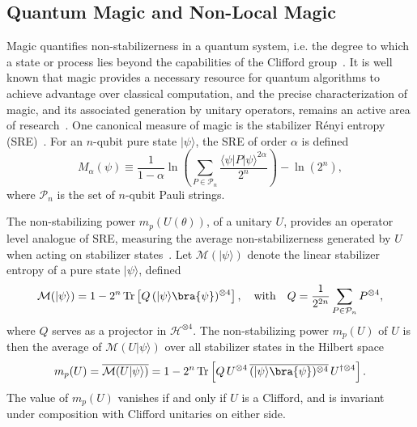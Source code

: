 \documentclass[12pt,a4paper]{article}
\def\ket#1{{|{#1}\rangle}}
\begin{document}
\subsection{Quantum Magic and Non-Local Magic}\label{MagicSection}

Magic quantifies non-stabilizerness in a quantum system, i.e. the degree to which a state or process lies beyond the capabilities of the Clifford group~\cite{Veitch2013}. It is well known that magic provides a necessary resource for quantum algorithms to achieve advantage over classical computation, and the precise characterization of magic, and its associated generation by unitary operators, remains an active area of research~\cite{Leone:2021rzd,Cao:2024nrx,tirrito:2024, haug:2025, faidon:2026, Munizzi:2025suf, Khumalo:2025xfv}. One canonical measure of magic is the stabilizer R\'{e}nyi entropy (SRE)~\cite{Leone:2021rzd}. For an $n$-qubit pure state $\ket{\psi}$, the SRE of order $\alpha$ is defined
%
\begin{equation}\label{eq:SRE1}
M_{\alpha}\left(\psi\right) \equiv \frac{1}{1-\alpha} \ln\left(\sum_{P \in \mathcal{P}_n} \frac{\langle\psi|P|\psi\rangle^{2\alpha}}{2^n}\right) - \ln\left(2^n\right),
\end{equation}
%
where $\mathcal{P}_n$ is the set of $n$-qubit Pauli strings.

The non-stabilizing power $m_p(U(\theta))$, of a unitary $U$, provides an operator level analogue of SRE, measuring the average non-stabilizerness generated by $U$ when acting on stabilizer states~\cite{Varikuti:2025poy}. Let $\mathcal{M}(\ket{\psi})$ denote the linear stabilizer entropy of a pure state $\ket{\psi}$, defined
%
\begin{equation}\label{LinearStabEntropy}
\mathcal{M}(\ket{\psi}) = 1 - 2^n\,\mathrm{Tr}\left[Q\,(\ket{\psi}\bra{\psi})^{\otimes 4}\right],\quad \textnormal{with} \quad Q = \frac{1}{2^{2n}}\sum_{P \in \mathcal{P}_n} P^{\otimes 4},
\end{equation}
%
where $Q$ serves as a projector in $\mathcal{H}^{\otimes 4}$. The non-stabilizing power $m_p(U)$ of $U$ is then the average of $\mathcal{M}(U\ket{\psi})$ over all stabilizer states in the Hilbert space
%
\begin{equation}\label{NSPDef}
m_p(U) = \overline{\mathcal{M}(U\ket{\psi})} = 1 - 2^n\,\mathrm{Tr}\left[Q\,U^{\otimes 4}\,\overline{(\ket{\psi}\bra{\psi})^{\otimes 4}}\,U^{\dagger\otimes 4}\right].
\end{equation}
%
The value of $m_p(U)$ vanishes if and only if $U$ is a Clifford, and is invariant under composition with Clifford unitaries on either side.
\end{document}
